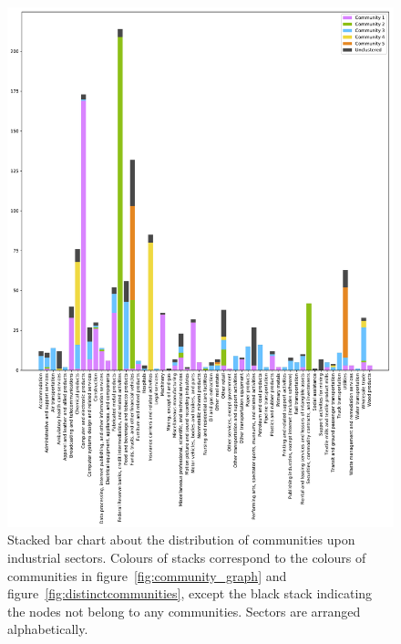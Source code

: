 \begin{figure} %
	\begin{center}
		\includegraphics[width=15cm]{community_sector_stacked}
	\end{center}
	\caption{Stacked bar chart about the distribution of communities upon industrial sectors. Colours of stacks correspond to the colours of communities in figure~\ref{fig:community_graph} and figure~\ref{fig:distinctcommunities}, except the black stack indicating the nodes not belong to any communities. Sectors are arranged alphabetically.}
	\label{fig:community_sector_stacked}
\end{figure}

